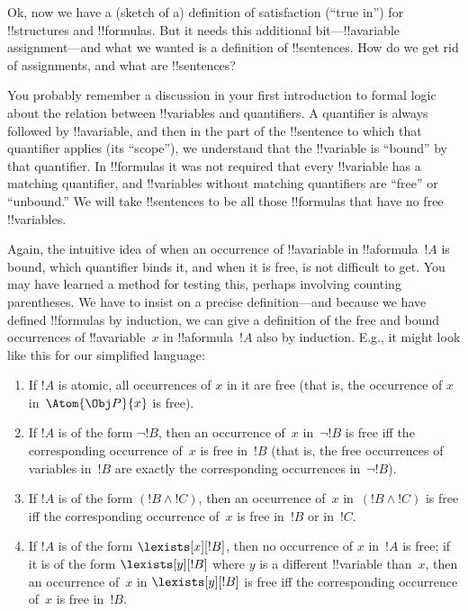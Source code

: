

Ok, now we have a (sketch of a) definition of satisfaction (``true
in'') for !!{structure}s and !!{formula}s. But it needs this
additional bit---!!a{variable} assignment---and what we wanted is a
definition of !!{sentence}s. How do we get rid of assignments, and
what are !!{sentence}s?

You probably remember a discussion in your first introduction to
formal logic about the relation between !!{variable}s and quantifiers.
A quantifier is always followed by !!a{variable}, and then in the part
of the !!{sentence} to which that quantifier applies (its ``scope''),
we understand that the !!{variable} is ``bound'' by that quantifier.
In !!{formula}s it was not required that every !!{variable} has a
matching quantifier, and !!{variable}s without matching quantifiers
are ``free'' or ``unbound.''  We will take !!{sentence}s to be all
those !!{formula}s that have no free !!{variable}s.

Again, the intuitive idea of when an occurrence of !!a{variable} in
!!a{formula}~$!A$ is bound, which quantifier binds it, and when it is
free, is not difficult to get. You may have learned a method for
testing this, perhaps involving counting parentheses.  We have to
insist on a precise definition---and because we have defined
!!{formula}s by induction, we can give a definition of the free and
bound occurrences of !!a{variable}~$x$ in !!a{formula}~$!A$ also by
induction.  E.g., it might look like this for our simplified language:
\begin{enumerate}
  \item If $!A$ is atomic, all occurrences of $x$ in it are free (that
  is, the occurrence of $x$ in~$\Atom{\Obj P}{x}$ is free).
  \item If $!A$ is of the form $\lnot !B$, then an occurrence of~$x$
  in~$\lnot !B$ is free iff the corresponding occurrence of~$x$ is
  free in~$!B$ (that is, the free occurrences of variables in~$
  !B$ are exactly the corresponding occurrences in~$\lnot !B$).
  \item If $!A$ is of the form $(!B \land !C)$, then an occurrence of~$x$
  in~$(!B \land !C)$ is free iff the corresponding occurrence of~$x$ is
  free in~$!B$ or in~$!C$.
  \item If $!A$ is of the form $\lexists[x][!B]$, then no occurrence
  of $x$ in~$!A$ is free; if it is of the form $\lexists[y][!B]$ where
  $y$ is a different !!{variable} than~$x$, then an occurrence of~$x$
  in $\lexists[y][!B]$ is free iff the corresponding occurrence of~$x$
  is free in~$!B$.
\end{enumerate}

